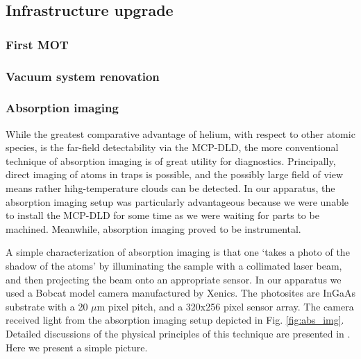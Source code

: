 \subsection*{Infrastructure upgrade}

\subsubsection{First MOT}
\subsubsection{Vacuum system renovation}
\subsubsection*{Absorption imaging}

While the greatest comparative advantage of helium, with respect to other atomic species, is the far-field detectability via the MCP-DLD, the more conventional technique of absorption imaging is of great utility for diagnostics. Principally, direct imaging of atoms in traps is possible, and the possibly large field of view means rather hihg-temperature clouds can be detected. In our apparatus, the absorption imaging setup was particularly advantageous because we were unable to install the MCP-DLD for some time as we were waiting for parts to be machined. Meanwhile, absorption imaging proved to be instrumental.

A simple characterization of absorption imaging is that one `takes a photo of the shadow of the atoms' by illuminating the sample with a collimated laser beam, and then projecting the beam onto an appropriate sensor. In our apparatus we used a Bobcat model camera manufactured by Xenics. The photosites are InGaAs substrate with a 20 $\mu$m pixel pitch, and a 320x256 pixel sensor array. The camera received light from the absorption imaging setup depicted in Fig. \ref{fig:abs_img}. Detailed discussions of the physical principles of this technique are presented in \cite{MakingProbingUnderstanding,TychkovThesis}. Here we present a simple picture.

